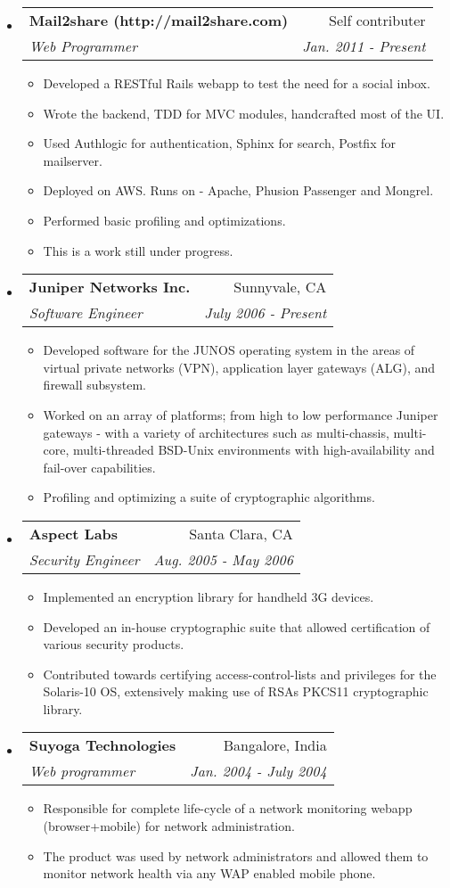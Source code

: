 \documentclass[letterpaper,11pt]{article}
\makeatletter
\newcommand{\resitem}[1]{\item #1 \vspace{-2pt}}
\newcommand{\resheading}[1]{{\large \parashade[.9]{sharpcorners}{\textbf{#1 \vphantom{p\^{E}}}}}}
\newcommand{\ressubheading}[4]{
\begin{tabular*}{6.5in}{l@{\extracolsep{\fill}}r}
		\textbf{#1} & #2 \\
		\textit{#3} & \textit{#4} \\
\end{tabular*}\vspace{-6pt}}
\makeatother
\begin{document}
\resheading{Work Experience}
\begin{itemize}

\item
	\ressubheading{Mail2share (http://mail2share.com)}{Self contributer}{Web Programmer}{Jan. 2011 - Present}
	\begin{itemize}
		\resitem{Developed a RESTful Rails webapp to test the need for a social inbox.}
		\resitem{Wrote the backend, TDD for MVC modules, handcrafted most of the UI.}
		\resitem{Used Authlogic for authentication, Sphinx for search, Postfix for mailserver.}
		\resitem{Deployed on AWS. Runs on - Apache, Phusion Passenger and Mongrel.}
		\resitem{Performed basic profiling and optimizations.}
		\resitem{This is a work still under progress.}
	\end{itemize}
		
\item
	\ressubheading{Juniper Networks Inc.}{Sunnyvale, CA}{Software Engineer}{July 2006 - Present}
	\begin{itemize}
		\resitem{Developed software for the JUNOS operating system in the areas of virtual 
		         private networks (VPN), application layer gateways (ALG), and firewall subsystem.}
		\resitem{Worked on an array of platforms; from high to low performance Juniper gateways - 
				 with a variety of architectures such as multi-chassis, multi-core, multi-threaded 
				 BSD-Unix environments with high-availability and fail-over capabilities.}
		\resitem{Profiling and optimizing a suite of cryptographic algorithms.}
	\end{itemize}

\item 
	\ressubheading{Aspect Labs}{Santa Clara, CA}{Security Engineer}{Aug. 2005 - May 2006}
	\begin{itemize}
		\resitem{Implemented an encryption library for handheld 3G devices.}
		\resitem{Developed an in-house cryptographic suite that allowed certification of various 
				 security products.}
		\resitem{Contributed towards certifying access-control-lists and privileges for the 
				 Solaris-10 OS, extensively making use of RSAs PKCS11 cryptographic library.}
	\end{itemize}

\item
	\ressubheading{Suyoga Technologies}{Bangalore, India}{Web programmer}{Jan. 2004 - July 2004}
	\begin{itemize}
		\resitem{Responsible for complete life-cycle of a network monitoring webapp (browser+mobile) 
				 for network administration.}
		\resitem{The product was used by network administrators and allowed them to monitor network 
				 health via any WAP enabled mobile phone.} 
	\end{itemize}
	
\end{itemize}
\end{document}
